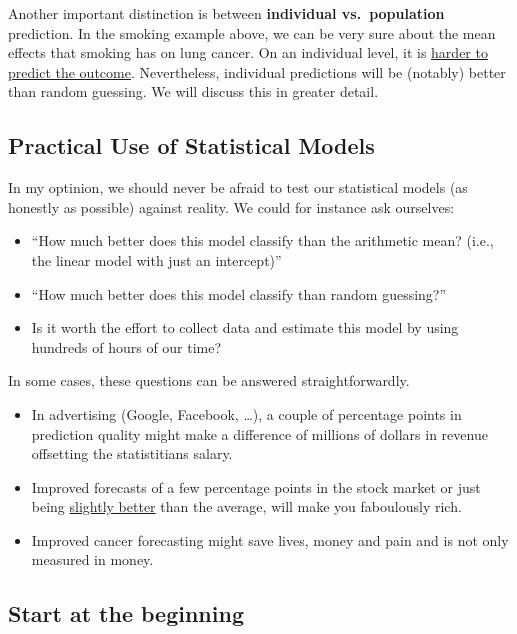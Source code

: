 \documentclass[
]{book}
\begin{document}
Another important distinction is between \textbf{individual vs.~population} prediction.
In the smoking example above, we can be very sure about the mean effects that smoking has on lung cancer.
On an individual level, it is \href{https://www.liebertpub.com/doi/10.1089/rej.2019.2298}{harder to predict the outcome}.
Nevertheless, individual predictions will be (notably) better than random guessing. We will discuss this in greater detail.

\subsection{Practical Use of Statistical Models}\label{practical-use-of-statistical-models}

In my optinion, we should never be afraid to test our statistical models (as honestly as possible) against reality.
We could for instance ask ourselves:

\begin{itemize}
\item
  ``How much better does this model classify than the arithmetic mean?
  (i.e., the linear model with just an intercept)''
\item
  ``How much better does this model classify than random guessing?''
\item
  Is it worth the effort to collect data and estimate this model by using hundreds of hours of our time?
\end{itemize}

In some cases, these questions can be answered straightforwardly.

\begin{itemize}
\item
  In advertising (Google, Facebook, \ldots), a couple of percentage points in prediction quality might make a difference of millions
  of dollars in revenue offsetting the statistitians salary.
\item
  Improved forecasts of a few percentage points in the stock market or just being \href{https://en.wikipedia.org/wiki/Jim_Simons}{slightly better}
  than the average, will make you faboulously rich.
\item
  Improved cancer forecasting might save lives, money and pain and is not only measured in money.
\end{itemize}

\subsection{Start at the beginning}\label{start-at-the-beginning}
\end{document}
